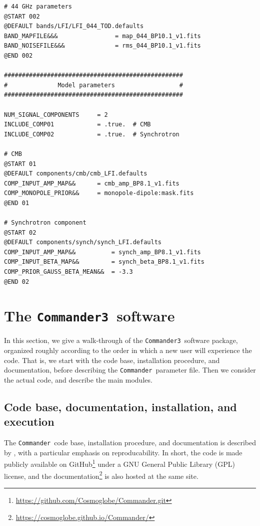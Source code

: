 \documentclass[twocolumn]{aa}
\def\commander{\texttt{Commander}}
\def\commanderthree{\texttt{Commander3}}
\begin{document}
\begin{lstfloat}[t]
{\begin{tcolorbox}
\begin{lstlisting}
# 44 GHz parameters
@START 002
@DEFAULT bands/LFI/LFI_044_TOD.defaults
BAND_MAPFILE&&&                = map_044_BP10.1_v1.fits
BAND_NOISEFILE&&&              = rms_044_BP10.1_v1.fits
@END 002

##################################################
#              Model parameters                  #
##################################################

NUM_SIGNAL_COMPONENTS     = 2
INCLUDE_COMP01            = .true.  # CMB 
INCLUDE_COMP02            = .true.  # Synchrotron

# CMB
@START 01
@DEFAULT components/cmb/cmb_LFI.defaults
COMP_INPUT_AMP_MAP&&      = cmb_amp_BP8.1_v1.fits
COMP_MONOPOLE_PRIOR&&     = monopole-dipole:mask.fits
@END 01

# Synchrotron component
@START 02
@DEFAULT components/synch/synch_LFI.defaults
COMP_INPUT_AMP_MAP&&          = synch_amp_BP8.1_v1.fits
COMP_INPUT_BETA_MAP&&         = synch_beta_BP8.1_v1.fits
COMP_PRIOR_GAUSS_BETA_MEAN&&  = -3.3
@END 02
\end{lstlisting}
    \end{tcolorbox}
}
\caption{Prototype \commander\ parameter file.}\label{listing:param}
\end{lstfloat}


\section{The \commanderthree\ software}
\label{sec:commander3}

In this section, we give a walk-through of the
\commanderthree\ software package, organized roughly according to the
order in which a new user will experience the code. That is, we start
with the code base, installation procedure, and documentation, before
describing the \commander\ parameter file. Then we consider the actual
code, and describe the main modules. 

\subsection{Code base, documentation, installation, and execution}

The \commander\ code base, installation procedure, and documentation
is described by \citet{BP05}, with a particular emphasis on
reproducability. In short, the code is made publicly available on
GitHub\footnote{\url{https://github.com/Cosmoglobe/Commander.git}}
under a GNU General Public Library (GPL) license, and the
documentation\footnote{\url{https://cosmoglobe.github.io/Commander/}}
is also hosted at the same site.
\end{document}
